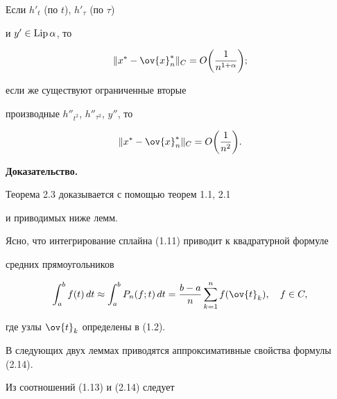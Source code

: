 \begin{cornonum}


Если $h'_t$ (по $t$), $h'_\tau$ (по $\tau$)


и $y'\in\operatorname{Lip}\alpha$, то


\begin{equation}


\|x^*-\ov{x}_n^*\|_C=O\bigg(\frac{1}{n^{1+\alpha}}\bigg);


\end{equation}


если же существуют ограниченные вторые 


производные $h''_{t^2}$, $h''_{\tau^2}$, $y''$, то


\begin{equation}


\|x^*-\ov{x}_n^*\|_C=O\bigg(\frac{1}{n^2}\bigg).


\end{equation}


\end{cornonum}





{\bf Доказательство.}


Теорема 2.3 доказывается с помощью теорем 1.1, 2.1


и приводимых ниже лемм.





Ясно, что интегрирование сплайна (1.11) приводит к квадратурной формуле


средних прямоугольников


\begin{equation}


\intl_a^bf(t)\, dt\approx \intl_a^bP_n(f;t)\, dt=


\frac{b-a}{n}\sum_{k=1}^nf(\ov{t}_k),\quad f\in C,


\end{equation}


где узлы $\ov{t}_k$ определены в (1.2).





В следующих двух леммах приводятся аппроксимативные свойства формулы (2.14).


Из соотношений (1.13) и (2.14) следует





